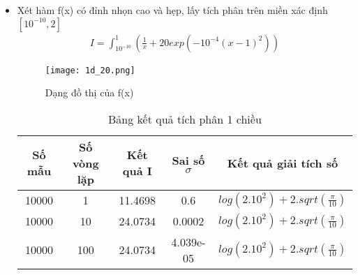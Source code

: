 \begin{itemize}
    \item Xét hàm f(x) có đỉnh nhọn cao và hẹp, lấy tích phân trên miền xác định $[10^{-10},2]$
    \begin{align}
        I = \int_{10^{-10}}^{1}\left({\frac{1}{x}+20exp(-10^{-4}(x-1)^2)}\right)
    \end{align}
    \begin{figure}[H]
        \centering
        \texttt{[image: 1d\_20.png]}
        \caption{Dạng đồ thị của f(x)}\label{hinh3.2}
    \end{figure}
    \begin{table}[H]
        \centering
        \begin{tabular}{ |c|c|c|c|c| }
         \hline
         \multicolumn{1}{|c}{Số mẫu} & \multicolumn{1}{|c|}{Số vòng lặp} & \multicolumn{1}{|c|}{Kết quả I} & \multicolumn{1}{|c|}{Sai số $\sigma$} & \multicolumn{1}{|c|}{Kết quả giải tích số} \\
         \hline
         10000 & 1  & 11.4698 & 0.6 & $log(2.10^2) + 2.sqrt(\frac{\pi}{10})$ \\
         \hline
         10000 & 10  & 24.0734 & 0.0002 & $log(2.10^2) + 2.sqrt(\frac{\pi}{10})$ \\
         \hline
         10000 & 100  & 24.0734 & 4.039e-05 & $log(2.10^2) + 2.sqrt(\frac{\pi}{10})$ \\
         \hline
        \end{tabular}
        \caption{Bảng kết quả tích phân 1 chiều}
        \label{1d_x02505075}
       \end{table}
    

\end{itemize}

